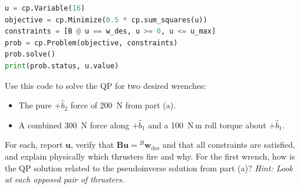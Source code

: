 \documentclass[11pt,letterpaper]{article}
\newcommand{\bu}{\mathbf{u}}
\newcommand{\bB}{\mathbf{B}}
\newcommand{\bwr}{\mathbf{w}}
\begin{document}
\begin{enumerate}[label=(\alph*)]
\begin{lstlisting}[language=Python]
u = cp.Variable(16)
objective = cp.Minimize(0.5 * cp.sum_squares(u))
constraints = [B @ u == w_des, u >= 0, u <= u_max]
prob = cp.Problem(objective, constraints)
prob.solve()
print(prob.status, u.value)
\end{lstlisting}
    Use this code to solve the QP for two desired wrenches:
    \begin{itemize}
        \item The pure $+\hat b_2$ force of 200~N from part (a).
        \item A combined 300~N force along $+\hat b_1$ and a 100~N\,m roll torque about $+\hat b_1$.
    \end{itemize}
    For each, report $\bu$, verify that $\bB\bu = {}^{B}\bwr_{\text{des}}$ and that all constraints are satisfied, and explain physically which thrusters fire and why. For the first wrench, how is the QP solution related to the pseudoinverse solution from part (a)? \emph{Hint: Look at each opposed pair of thrusters.}
\end{enumerate}
\end{document}
